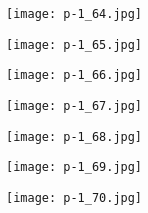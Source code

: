 \clearpage


\begin{figure}
    \begin{center}
        \texttt{[image: p-1\_64.jpg]}
        \caption{}
    \end{center}
\end{figure}

\clearpage


\begin{figure}
    \begin{center}
        \texttt{[image: p-1\_65.jpg]}
        \caption{}
    \end{center}
\end{figure}

\clearpage


\begin{figure}
    \begin{center}
        \texttt{[image: p-1\_66.jpg]}
        \caption{}
    \end{center}
\end{figure}

\clearpage


\begin{figure}
    \begin{center}
        \texttt{[image: p-1\_67.jpg]}
        \caption{}
    \end{center}
\end{figure}

\clearpage


\begin{figure}
    \begin{center}
        \texttt{[image: p-1\_68.jpg]}
        \caption{}
    \end{center}
\end{figure}

\clearpage


\begin{figure}
    \begin{center}
        \texttt{[image: p-1\_69.jpg]}
        \caption{}
    \end{center}
\end{figure}

\clearpage


\begin{figure}
    \begin{center}
        \texttt{[image: p-1\_70.jpg]}
        \caption{}
    \end{center}
\end{figure}

